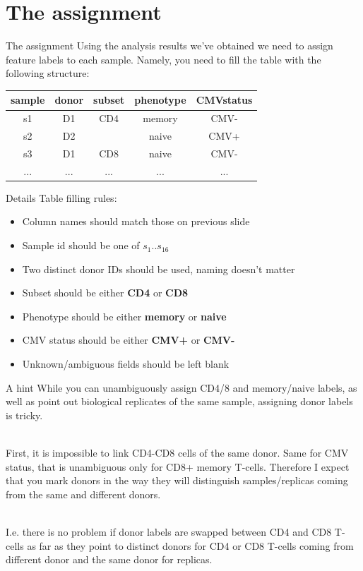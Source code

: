 \documentclass[12pt]{beamer}
\begin{document}
\section{The assignment}

\begin{frame}{The assignment}
Using the analysis results we've obtained we need to assign feature labels to each sample. Namely, you need to fill the table with the following structure:
\begin{table}[h!]
  \begin{center}
    \begin{tabular}{c|c|c|c|c}
      \textbf{sample} & \textbf{donor} & \textbf{subset} & \textbf{phenotype} & \textbf{CMVstatus} \\
      \hline
      s1 & D1 & CD4 & memory & CMV- \\
      s2 & D2 &   & naive & CMV+ \\
      s3 & D1 & CD8 & naive & CMV- \\
      ... & ... & ... & ... & ... \\
    \end{tabular}
  \end{center}
\end{table}
\end{frame}

\begin{frame}{Details}
Table filling rules:
\begin{itemize}
\item Column names should match those on previous slide
\item Sample id should be one of $s_1..s_{16}$
\item Two distinct donor IDs should be used, naming doesn't matter
\item Subset should be either \textbf{CD4} or \textbf{CD8}
\item Phenotype should be either \textbf{memory} or \textbf{naive}
\item CMV status should be either \textbf{CMV+} or \textbf{CMV-}
\item Unknown/ambiguous fields should be left blank
\end{itemize}
\end{frame}

\begin{frame}{A hint}
While you can unambiguously assign CD4/8 and memory/naive labels, as well as point out biological replicates of the same sample, assigning donor labels is tricky.\\~\

First, it is impossible to link CD4-CD8 cells of the same donor. Same for CMV status, that is unambiguous only for CD8+ memory T-cells. Therefore I expect that you mark donors in the way they will distinguish samples/replicas coming from the same and different donors.\\~\

I.e. there is no problem if donor labels are swapped between CD4 and CD8 T-cells as far as they point to distinct donors for CD4 or CD8 T-cells coming from different donor and the same donor for replicas.
\end{frame}
\end{document}
